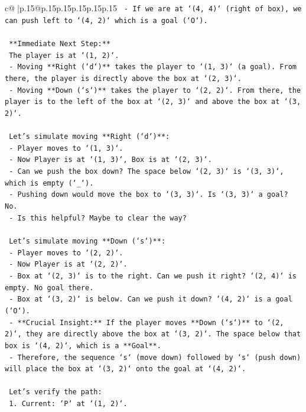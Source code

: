 \documentclass{article}
\begin{document}
{\begin{supertabular}{c@{$\;$}|p{.15\linewidth}@{}p{.15\linewidth}p{.15\linewidth}p{.15\linewidth}p{.15\linewidth}p{.15\linewidth}}
{{{\texttt{    {-} If we are at `(4, 4)` (right of box), we can push left to `(4, 2)` which is a goal (`O`).} \\
\\ 
\texttt{    **Immediate Next Step:**} \\
\texttt{    The player is at `(1, 2)`.} \\
\texttt{    {-} Moving **Right (`d`)** takes the player to `(1, 3)` (a goal). From there, the player is directly above the box at `(2, 3)`.} \\
\texttt{    {-} Moving **Down (`s`)** takes the player to `(2, 2)`. From there, the player is to the left of the box at `(2, 3)` and above the box at `(3, 2)`.} \\
\\ 
\texttt{    Let's simulate moving **Right (`d`)**:} \\
\texttt{    {-} Player moves to `(1, 3)`.} \\
\texttt{    {-} Now Player is at `(1, 3)`, Box is at `(2, 3)`.} \\
\texttt{    {-} Can we push the box down? The space below `(2, 3)` is `(3, 3)`, which is empty (`\_`).} \\
\texttt{    {-} Pushing down would move the box to `(3, 3)`. Is `(3, 3)` a goal? No.} \\
\texttt{    {-} Is this helpful? Maybe to clear the way?} \\
\\ 
\texttt{    Let's simulate moving **Down (`s`)**:} \\
\texttt{    {-} Player moves to `(2, 2)`.} \\
\texttt{    {-} Now Player is at `(2, 2)`.} \\
\texttt{    {-} Box at `(2, 3)` is to the right. Can we push it right? `(2, 4)` is empty. No goal there.} \\
\texttt{    {-} Box at `(3, 2)` is below. Can we push it down? `(4, 2)` is a goal (`O`).} \\
\texttt{    {-} **Crucial Insight:** If the player moves **Down (`s`)** to `(2, 2)`, they are directly above the box at `(3, 2)`. The space below that box is `(4, 2)`, which is a **Goal**.} \\
\texttt{    {-} Therefore, the sequence `s` (move down) followed by `s` (push down) will place the box at `(3, 2)` onto the goal at `(4, 2)`.} \\
\\ 
\texttt{    Let's verify the path:} \\
\texttt{    1. Current: `P` at `(1, 2)`.} \\
}}}
\end{supertabular}}
\end{document}
